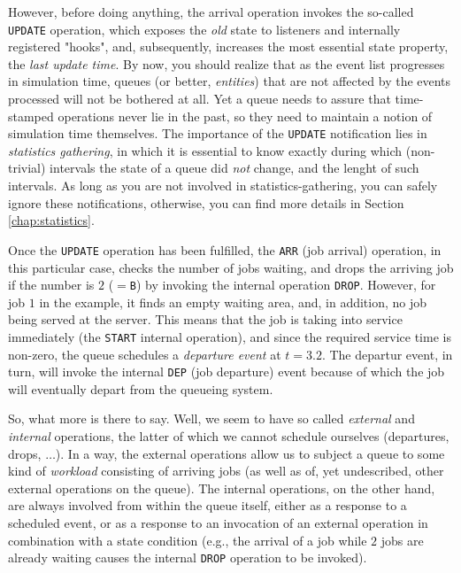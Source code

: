 \documentclass[12pt]{book}
\begin{document}
However, before doing anything,
  the arrival operation invokes
  the so-called \lstinline|UPDATE| operation,
  which exposes the {\em old\/} state
  to listeners and internally registered "hooks",
  and, subsequently, increases the most essential state
  property, the {\em last update time}.
By now, you should realize that
  as the event list progresses in simulation time,
  queues (or better, {\em entities\/})
  that are not affected by the events processed
  will not be bothered at all.
Yet a queue needs to assure that time-stamped operations
  never lie in the past,
  so they need to maintain a notion of simulation time themselves.
The importance of the \lstinline|UPDATE| notification
  lies in {\em statistics gathering},
  in which it is essential to know exactly
  during which (non-trivial) intervals
  the state of a queue did {\em not\/} change,
  and the lenght of such intervals.
As long as you are not involved in statistics-gathering,
  you can safely ignore these notifications,
  otherwise,
  you can find more details in Section \ref{chap:statistics}.

Once the \lstinline|UPDATE| operation has been
  fulfilled, the \lstinline|ARR| (job arrival) operation,
  in this particular case,
  checks the number of jobs waiting,
  and drops the arriving job if the number is $2$ ($=$\lstinline|B|)
  by invoking the internal operation \lstinline|DROP|.
However, for job $1$ in the example,
  it finds an empty waiting area,
  and, in addition, no job being served at the server.
This means that the job is taking into service immediately
  (the \lstinline|START| internal operation),
  and since the required service time is non-zero,
  the queue schedules a {\em departure event\/}
  at $t=3.2$.
The departur event, in turn,
  will invoke the internal \lstinline|DEP| (job departure)
  event because of which the job
  will eventually depart from the queueing system.

So, what more is there to say.
Well, we seem to have so called {\em external\/}
  and {\em internal\/} operations,
  the latter of which we cannot schedule ourselves
  (departures, drops, $\ldots$).
In a way, the external operations allow us
  to subject a queue to some kind of {\em workload\/}
  consisting of arriving jobs
  (as well as of, yet undescribed, other external operations on the queue).
The internal operations, on the other hand,
  are always involved from within the queue itself,
  either as a response to a scheduled event,
  or as a response to an invocation of an external operation
  in combination with a state condition
  (e.g., the arrival of a job while $2$ jobs are already waiting
  causes the internal \lstinline|DROP| operation to be invoked).
 
\end{document}
